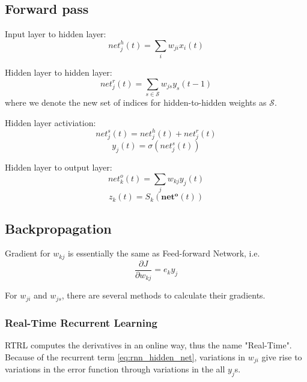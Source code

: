 \documentclass[12pt]{article}
\numberwithin{equation}{section}
\begin{document}
\subsection{Forward pass}
Input layer to hidden layer:
\begin{equation}
    net^h_j(t) = \sum_i{w_{ji}x_i(t)}
\end{equation}

Hidden layer to hidden layer:
\begin{equation} \label{eq:rnn_hidden_net}
    net^r_j(t) = \sum_{s \in \mathcal{S}}{w_{js}y_s(t - 1)}
\end{equation}
where we denote the new set of indices for hidden-to-hidden weights as $\mathcal{S}$.

Hidden layer activiation:
\begin{equation} 
    net^s_j(t) = net^h_j(t) + net^r_j(t)
\end{equation}
\begin{equation} \label{eq:rnn_hidden_ac}
    y_j(t) = \sigma(net^s_j(t))
\end{equation}

Hidden layer to output layer:
\begin{equation} \label{eq:rnn_ff_netk}
    net^o_k(t) = \sum_j{w_{kj}y_j(t)}
\end{equation}
\begin{equation} \label{eq:rnn_output_ac}
    z_k(t) = S_k(\bm{net^o}(t))
\end{equation}

\subsection{Backpropagation}
Gradient for $w_{kj}$ is essentially the  same as Feed-forward Network, i.e.
\begin{equation}
    \frac{\partial J}{\partial w_{kj}} = e_ky_j
\end{equation}

For $w_{ji}$ and $w_{js}$, there are several methods to calculate their gradients.

\subsubsection{Real-Time Recurrent Learning}
RTRL\cite{williams1989learning} computes the derivatives in an online way, thus the name "Real-Time".
Because of the recurrent term \eqref{eq:rnn_hidden_net}, variations in $w_{ji}$ give rise to variations in the error function through variations in the all $y_j$s.
\end{document}
